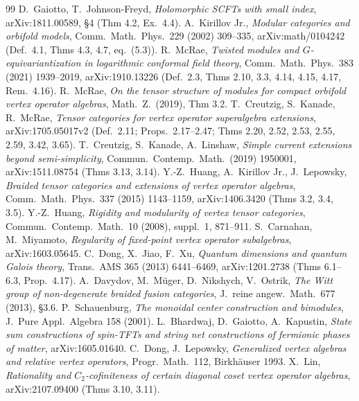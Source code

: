 \documentclass[11pt]{article}
\theoremstyle{definition}
\begin{document}
\begin{thebibliography}{99}\small
{} D.~Gaiotto, T.~Johnson-Freyd, \emph{Holomorphic SCFTs with small index}, arXiv:1811.00589, \S4 (Thm 4.2, Ex.~4.4).
 A.~Kirillov Jr., \emph{Modular categories and orbifold models}, Comm.~Math.~Phys.~229 (2002) 309--335, arXiv:math/0104242 (Def.~4.1, Thms 4.3, 4.7, eq.~(5.3)).
 R.~McRae, \emph{Twisted modules and $G$-equivariantization in logarithmic conformal field theory}, Comm.~Math.~Phys.~383 (2021) 1939--2019, arXiv:1910.13226 (Def.~2.3, Thms 2.10, 3.3, 4.14, 4.15, 4.17, Rem.~4.16).
 R.~McRae, \emph{On the tensor structure of modules for compact orbifold vertex operator algebras}, Math.~Z.~(2019), Thm 3.2.
 T.~Creutzig, S.~Kanade, R.~McRae, \emph{Tensor categories for vertex operator superalgebra extensions}, arXiv:1705.05017v2 (Def.~2.11; Props.~2.17--2.47; Thms 2.20, 2.52, 2.53, 2.55, 2.59, 3.42, 3.65).
 T.~Creutzig, S.~Kanade, A.~Linshaw, \emph{Simple current extensions beyond semi-simplicity}, Commun.~Contemp.~Math.~(2019) 1950001, arXiv:1511.08754 (Thms 3.13, 3.14).
 Y.-Z.~Huang, A.~Kirillov Jr., J.~Lepowsky, \emph{Braided tensor categories and extensions of vertex operator algebras}, Comm.~Math.~Phys.~337 (2015) 1143--1159, arXiv:1406.3420 (Thms 3.2, 3.4, 3.5).
 Y.-Z.~Huang, \emph{Rigidity and modularity of vertex tensor categories}, Commun.~Contemp.~Math.~10 (2008), suppl.~1, 871--911.
 S.~Carnahan, M.~Miyamoto, \emph{Regularity of fixed-point vertex operator subalgebras}, arXiv:1603.05645.
 C.~Dong, X.~Jiao, F.~Xu, \emph{Quantum dimensions and quantum Galois theory}, Trans.~AMS 365 (2013) 6441--6469, arXiv:1201.2738 (Thms 6.1--6.3, Prop.~4.17).
 A.~Davydov, M.~M\"uger, D.~Nikshych, V.~Ostrik, \emph{The Witt group of non-degenerate braided fusion categories}, J.~reine angew.~Math.~677 (2013), \S3.6.
 P.~Schauenburg, \emph{The monoidal center construction and bimodules}, J.~Pure Appl.~Algebra 158 (2001).
 L.~Bhardwaj, D.~Gaiotto, A.~Kapustin, \emph{State sum constructions of spin-TFTs and string net constructions of fermionic phases of matter}, arXiv:1605.01640.
 C.~Dong, J.~Lepowsky, \emph{Generalized vertex algebras and relative vertex operators}, Progr.~Math.~112, Birkh\"auser 1993.
 X.~Lin, \emph{Rationality and $C_2$-cofiniteness of certain diagonal coset vertex operator algebras}, arXiv:2107.09400 (Thms 3.10, 3.11).
\end{thebibliography}
\end{document}

